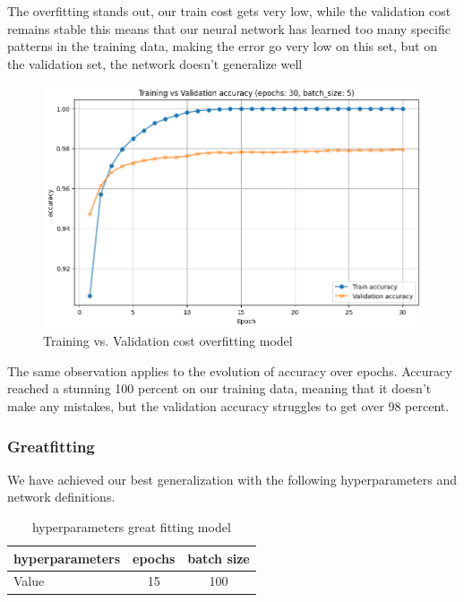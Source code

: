 \documentclass[a4paper, twocolumn, twoside]{article}
\begin{document}
	The overfitting stands out, our train cost gets very low, while the validation cost remains stable
	this means that our neural network has learned too many specific patterns in the training data,
	making the error go very low on this set, but on the validation set, the network
	doesn't generalize well

	\begin{figure}[H]
		\begin{center}
			\includegraphics[width=\columnwidth]{images/accuracy_overfit.png}
		\end{center}
		\caption{Training vs. Validation cost overfitting model}\label{fig:accuracy_overfit}
	\end{figure}

	The same observation applies to the evolution of accuracy over epochs.
	Accuracy reached a stunning 100 percent on our training data, meaning that it doesn't make any mistakes, but the validation accuracy struggles to get over 98 percent.\\

        \subsubsection{Greatfitting}
	We have achieved our best generalization with the following hyperparameters and network definitions.
	\begin{table}[H]
	\centering
	\begin{tabular}{|l|c|c|}
	\hline
	hyperparameters & epochs & batch size  \\
	\hline
	Value & 15 & 100   \\
	\hline
	\end{tabular}
	\caption{hyperparameters great fitting model}
	\end{table}
\end{document}
